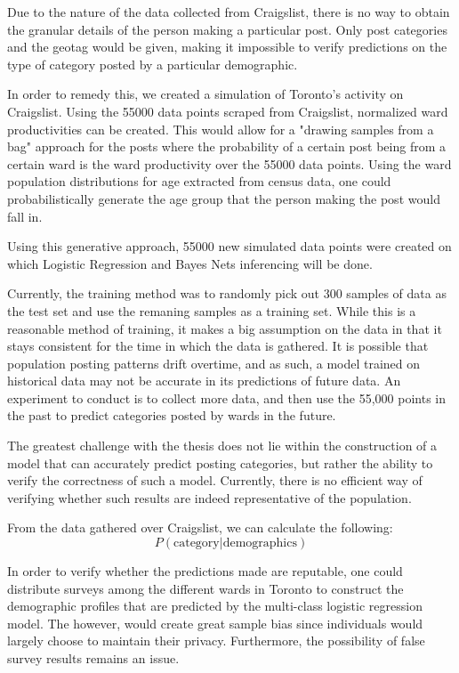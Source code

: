 \documentclass[12pt]{article}
\begin{document}
Due to the nature of the data collected from Craigslist, there is no way to obtain the granular details of the person making a particular post. Only post categories and the geotag would be given, making it impossible to verify predictions on the type of category posted by a particular demographic. 

In order to remedy this, we created a simulation of Toronto's activity on Craigslist. Using the 55000 data points scraped from Craigslist, normalized ward productivities can be created. This would allow for a "drawing samples from a bag" approach for the posts where the probability of a certain post being from a certain ward is the ward productivity over the 55000 data points. Using the ward population distributions for age extracted from census data, one could probabilistically generate the age group that the person making the post would fall in. 

Using this generative approach, 55000 new simulated data points were created on which Logistic Regression and Bayes Nets inferencing will be done.  


   Currently, the training method was to randomly pick out 300 samples of data as the test set and use the remaning samples as a training set. While this is a reasonable method of training, it makes a big assumption on the data in that it stays consistent for the time in which the data is gathered. It is possible that population posting patterns drift overtime, and as such, a model trained on historical data may not be accurate in its predictions of future data. An experiment to conduct is to collect more data, and then use the 55,000 points in the past to predict categories posted by wards in the future. 

   The greatest challenge with the thesis does not lie within the construction of a model that can accurately predict posting categories, but rather the ability to verify the correctness of such a model. Currently, there is no efficient way of verifying whether such results are indeed representative of the population.

   From the data gathered over Craigslist, we can calculate the following:
   \[P(\text{category} | \text{demographics})\]

   In order to verify whether the predictions made are reputable, one could distribute surveys among the different wards in Toronto to construct the demographic profiles that are predicted by the multi-class logistic regression model. The however, would create great sample bias since individuals would largely choose to maintain their privacy. Furthermore, the possibility of false survey results remains an issue.
\end{document}
